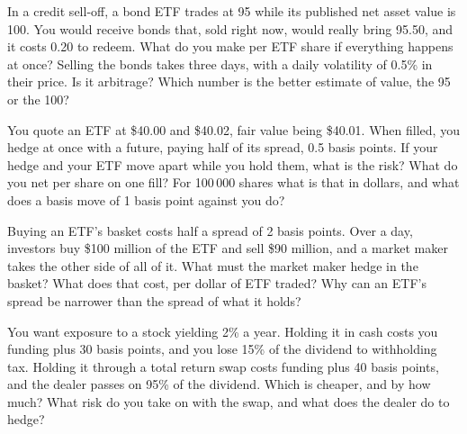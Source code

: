 \begin{question}\label{iq:iv2:etfs-futures-and-index-arbitrage:21}
In a credit sell-off, a bond ETF trades at 95 while its published net asset value is 100. You would receive bonds that, sold right now, would really bring 95.50, and it costs 0.20 to redeem. What do you make per ETF share if everything happens at once? Selling the bonds takes three days, with a daily volatility of 0.5\% in their price. Is it arbitrage? Which number is the better estimate of value, the 95 or the 100?
\end{question}

\begin{question}\label{iq:iv2:etfs-futures-and-index-arbitrage:22}
You quote an ETF at \$40.00 and \$40.02, fair value being \$40.01. When filled, you hedge at once with a future, paying half of its spread, 0.5 basis points. If your hedge and your ETF move apart while you hold them, what is the risk? What do you net per share on one fill? For 100\,000 shares what is that in dollars, and what does a basis move of 1 basis point against you do?
\end{question}

\begin{question}\label{iq:iv2:etfs-futures-and-index-arbitrage:23}
Buying an ETF's basket costs half a spread of 2 basis points. Over a day, investors buy \$100 million of the ETF and sell \$90 million, and a market maker takes the other side of all of it. What must the market maker hedge in the basket? What does that cost, per dollar of ETF traded? Why can an ETF's spread be narrower than the spread of what it holds?
\end{question}

\begin{question}\label{iq:iv2:etfs-futures-and-index-arbitrage:24}
You want exposure to a stock yielding 2\% a year. Holding it in cash costs you funding plus 30 basis points, and you lose 15\% of the dividend to withholding tax. Holding it through a total return swap costs funding plus 40 basis points, and the dealer passes on 95\% of the dividend. Which is cheaper, and by how much? What risk do you take on with the swap, and what does the dealer do to hedge?
\end{question}

